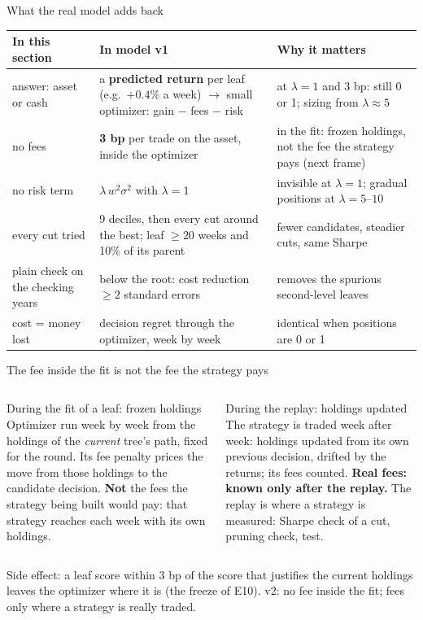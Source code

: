\documentclass[10pt,aspectratio=169]{beamer}
\newcommand{\1}{\mathbf{1}}
\begin{document}
\begin{frame}{What the real model adds back}
\scriptsize
\setlength{\tabcolsep}{5pt}
\begin{tabular}{@{}p{2.6cm} p{5.4cm} p{5.3cm}@{}}
\toprule
In this section & In model v1 & Why it matters\\
\midrule
answer: asset or cash & a \textbf{predicted return} per leaf (e.g.\ $+0.4\%$ a week) $\to$ small optimizer: gain $-$ fees $-$ risk & at $\lambda=1$ and 3 bp: still 0 or 1; sizing from $\lambda\approx5$\\
\addlinespace
no fees & \textbf{3 bp} per trade on the asset, inside the optimizer & in the fit: frozen holdings, not the fee the strategy pays (next frame)\\
\addlinespace
no risk term & $\lambda\,w^2\sigma^2$ with $\lambda=1$ & invisible at $\lambda=1$; gradual positions at $\lambda=5$--$10$\\
\addlinespace
every cut tried & 9 deciles, then every cut around the best; leaf $\ge20$ weeks and 10\% of its parent & fewer candidates, steadier cuts, same Sharpe\\
\addlinespace
plain check on the checking years & below the root: cost reduction $\ge2$ standard errors & removes the spurious second-level leaves\\
\addlinespace
cost = money lost & decision regret through the optimizer, week by week & identical when positions are 0 or 1\\
\bottomrule
\end{tabular}
\end{frame}

\begin{frame}{The fee inside the fit is not the fee the strategy pays}
\begin{columns}[T]
\begin{block}{During the fit of a leaf: frozen holdings}
\small
Optimizer run week by week from the holdings of the \emph{current} tree's path, fixed for the round. Its fee penalty prices the move from those holdings to the candidate decision. \textbf{Not} the fees the strategy being built would pay: that strategy reaches each week with its own holdings.
\end{block}
\begin{block}{During the replay: holdings updated}
\small
The strategy is traded week after week: holdings updated from its own previous decision, drifted by the returns; its fees counted. \textbf{Real fees: known only after the replay.} The replay is where a strategy is measured: Sharpe check of a cut, pruning check, test.
\end{block}
\end{columns}
\medskip
\small
Side effect: a leaf score within 3 bp of the score that justifies the current holdings leaves the optimizer where it is (the freeze of E10). v2: no fee inside the fit; fees only where a strategy is really traded.
\end{frame}
\end{document}
